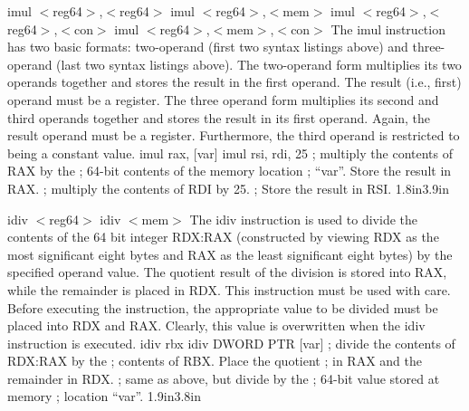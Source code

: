 {imul $<$reg64$>$,$<$reg64$>$\newline
imul $<$reg64$>$,$<$mem$>$\newline
imul $<$reg64$>$,$<$reg64$>$,$<$con$>$\newline
imul $<$reg64$>$,$<$mem$>$,$<$con$>$}
{The imul instruction has two basic formats: two-operand (first two
syntax listings above) and three-operand (last two syntax listings
above).  The two-operand form multiplies its two operands together and
stores the result in the first operand. The result (i.e., first)
operand must be a register.  The three operand form multiplies its
second and third operands together and stores the result in its first
operand. Again, the result operand must be a register.  Furthermore,
the third operand is restricted to being a constant value.}
{imul rax, [var]\newline\newline\newline
imul rsi, rdi, 25}
{; multiply the contents of RAX by the \newline
; 64-bit contents of the memory location \newline
; ``var''. Store the result in RAX.\newline
; multiply the contents of RDI by 25. \newline
; Store the result in RSI.}
{1.8in}{3.9in}

{idiv $<$reg64$>$\newline
idiv $<$mem$>$}
{The idiv instruction is used to divide the contents of the 64 bit
  integer RDX:RAX (constructed by viewing RDX as the most significant
  eight bytes and RAX as the least significant eight bytes) by the
  specified operand value. The quotient result of the division is
  stored into RAX, while the remainder is placed in RDX. This
  instruction must be used with care. Before executing the
  instruction, the appropriate value to be divided must be placed into
  RDX and RAX. Clearly, this value is overwritten when the idiv
  instruction is executed.}
{idiv rbx \newline\newline\newline idiv DWORD PTR [var]}
{; divide the contents of RDX:RAX by the \newline
; contents of RBX. Place the quotient \newline
; in RAX and the remainder in RDX.\newline
; same as above, but divide by the \newline
; 64-bit value stored at memory \newline
; location ``var''.}
{1.9in}{3.8in}


